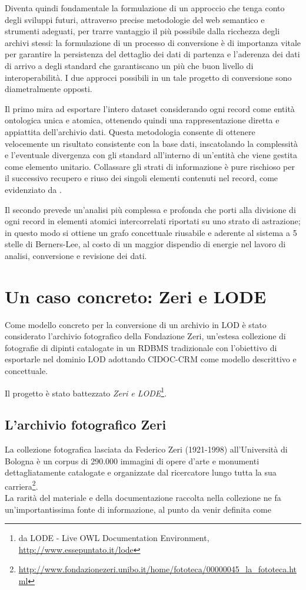 Diventa quindi fondamentale la formulazione di un approccio che tenga conto degli sviluppi futuri, attraverso precise metodologie del web semantico e strumenti adeguati, per trarre vantaggio il più possibile dalla ricchezza degli archivi stessi: la formulazione di un processo di conversione è di importanza vitale per garantire la persistenza del dettaglio dei dati di partenza e l'aderenza dei dati di arrivo a degli standard che garantiscano un più che buon livello di interoperabilità. I due approcci possibili in un tale progetto di conversione sono diametralmente opposti.

Il primo mira ad esportare l'intero dataset considerando ogni record come entità ontologica unica e atomica, ottenendo quindi una rappresentazione diretta e appiattita dell'archivio dati. Questa metodologia consente di ottenere velocemente un risultato consistente con la base dati, inscatolando la complessità e l'eventuale divergenza con gli standard all'interno di un'entità che viene gestita come elemento unitario. Collassare gli strati di informazione è pure rischioso per il successivo recupero e riuso dei singoli elementi contenuti nel record, come evidenziato da \cite{8}.

Il secondo prevede un'analisi più complessa e profonda che porti alla divisione di ogni record in elementi atomici intercorrelati riportati su uno strato di astrazione; in questo modo si ottiene un grafo concettuale riusabile e aderente al sistema a 5 stelle di Berners-Lee, al costo di un maggior dispendio di energie nel lavoro di analisi, conversione e revisione dei dati.

\section{Un caso concreto: Zeri e LODE}
Come modello concreto per la conversione di un archivio in LOD è stato considerato l'archivio fotografico della Fondazione Zeri, un'estesa collezione di fotografie di dipinti catalogate in un RDBMS tradizionale con l'obiettivo di esportarle nel dominio LOD adottando CIDOC-CRM come modello descrittivo e concettuale.

Il progetto è stato battezzato \emph{Zeri e LODE}\footnote{da LODE - Live OWL Documentation Environment, \url{http://www.essepuntato.it/lode}}.

\subsection{L'archivio fotografico Zeri}
La collezione fotografica lasciata da Federico Zeri (1921-1998) all'Università di Bologna è un corpus di 290.000 immagini di opere d'arte e monumenti dettagliatamente catalogate e organizzate dal ricercatore lungo tutta la sua carriera\footnote{\url{http://www.fondazionezeri.unibo.it/home/fototeca/00000045_la_fototeca.html}}.\\
La rarità del materiale e della documentazione raccolta nella collezione ne fa un'importantissima fonte di informazione, al punto da venir definita come

